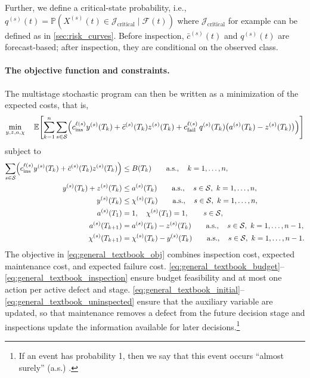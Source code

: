 Further, we define a critical-state probability, i.e., 
$
q^{(s)}(t) = \mathds P\left(X^{(s)}(t) \in \mathcal J_{\text{critical}} \mid \mathcal F(t) \right)
$ 
where $\mathcal J_{\text{critical}}$ for example can be defined as in \cref{sec:risk_curves}.
Before inspection, $\bar c^{(s)}(t)$ and $q^{(s)}(t)$ are forecast-based; after inspection, they are conditional on the observed class.

\paragraph{The objective function and constraints.}
The multistage stochastic program can then be written as a minimization of the expected costs, that is,
\begin{align}
\min_{y,z,a,\chi}\quad
\mathbb E\!\left[
\sum_{k=1}^n\sum_{s\in\mathcal S}
\Bigl(
c_{\mathrm{ins}}^{\ell(s)} y^{(s)}(T_k)
+ \bar c^{(s)}(T_k) z^{(s)}(T_k)
+ c_{\mathrm{fail}}^{\ell(s)}\,q^{(s)}(T_k)\bigl(a^{(s)}(T_k)-z^{(s)}(T_k)\bigr)
\Bigr)
\right]
\label{eq:general_textbook_obj}
\end{align}
subject to
\begin{align}
\sum_{s\in\mathcal S}
\Bigl(
c^{\ell(s)}_{\mathrm{ins}} y^{(s)} (T_k)
+ \bar c^{(s)}(T_k) z^{(s)}(T_k)
\Bigr)
&\le B(T_k)
\qquad \text{a.s.},\quad k = 1,\dots,n,
\label{eq:general_textbook_budget}\\
y^{(s)}(T_k)+z^{(s)}(T_k)
&\le a^{(s)}(T_k)
\qquad \text{a.s.},\quad s\in\mathcal S,\  k = 1,\dots,n,
\label{eq:general_textbook_exclusive}\\
y^{(s)}(T_k)
&\le \chi^{(s)}(T_k)
\qquad \text{a.s.},\quad s\in\mathcal S,\  k = 1,\dots,n,
\label{eq:general_textbook_inspection}\\
a^{(s)}(T_1)&=1,\quad \chi^{(s)}(T_1)=1,
\qquad s\in\mathcal S,
\label{eq:general_textbook_initial}\\
a^{(s)}(T_{k+1})&=a^{(s)}(T_k)-z^{(s)}(T_k)
\qquad \text{a.s.},\quad s\in\mathcal S,\ k=1,\dots,n-1,
\label{eq:general_textbook_activity}\\
\chi^{(s)}(T_{k+1})&=\chi^{(s)}(T_k)-y^{(s)}(T_k)
\qquad \text{a.s.},\quad s\in\mathcal S,\ k=1,\dots,n-1.
\label{eq:general_textbook_uninspected}
\end{align}
The objective in \cref{eq:general_textbook_obj} combines inspection cost, expected maintenance cost, and expected failure cost. 
\cref{eq:general_textbook_budget}--\cref{eq:general_textbook_inspection} ensure budget feasibility and at most one action per active defect and stage.
\cref{eq:general_textbook_initial}--\cref{eq:general_textbook_uninspected} ensure that the auxiliary variable are updated, so that maintenance removes a defect from the future decision stage and inspections update the information available for later decisions.\footnote{If an event has probability 1, then we say that this event occurs ``almost surely'' (a.s.) \citep[Chapter 3]{thygesen2023a}.}

